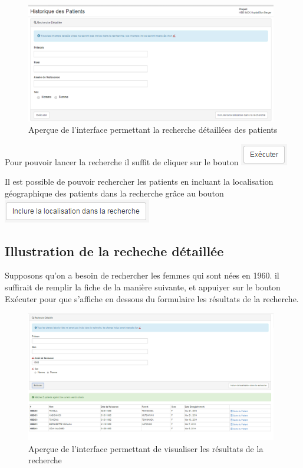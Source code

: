 \documentclass[12pt,a4paper]{report}
\begin{document}
\begin{figure}[h]
\begin{center}
\includegraphics[width=11cm]{pic/recherchePatient.png}
\end{center}
\caption{Aperçue de l'interface permettant la recherche détaillées des patients}
\label{Aperçue de l'interface permettant la recherche détaillées des patients}
\end{figure}  

Pour pouvoir lancer la recherche il suffit de cliquer sur le bouton \includegraphics[scale=0.7]{pic/ExeButton.png}

Il est possible de pouvoir rechercher les patients en incluant la localisation géographique des patients dans la recherche grâce au bouton \includegraphics[scale=0.7]{pic/LocalisationRecherche.png}

\subsection{Illustration de la recheche détaillée}
Supposons qu'on a besoin de rechercher les femmes qui sont nées en 1960. il suffirait de remplir la fiche de la manière suivante, et appuiyer sur le bouton Exécuter pour que s'affiche en dessous du formulaire les résultats de la recherche. 

\begin{figure}[h]
\begin{center}
\includegraphics[width=11cm]{pic/RechecheDetailler.png}
\end{center}
\caption{Aperçue de l'interface permettant de visualiser les résultats de la recherche}
\label{Aperçue de l'interface permettant de visualiser les résultats de la recherche}
\end{figure} 
\end{document}
